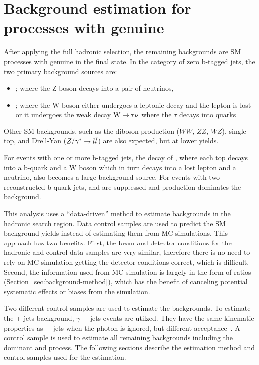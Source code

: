 \clearpage
\section{Background estimation for processes with genuine \texorpdfstring{\met}{MET}\label{sec:backgrounds}}

After applying the full hadronic selection, the remaining 
backgrounds are SM processes with genuine \met in the final state. 
In the category of zero b-tagged jets, the two primary background sources are:
\begin{itemize}
\item \zj; where the Z boson decays into a pair of neutrinos, 
\item \wj; where the W boson either undergoes a leptonic decay 
and the lepton is lost or it undergoes the weak decay ${\text W} \rightarrow \tau\nu$ where the $\tau$ decays into quarks
\end{itemize}
%
Other SM backgrounds, such as the diboson production ($WW,\,ZZ,\,WZ$), single-top, and 
Drell-Yan ($Z/\gamma^{*} \rightarrow l\bar{l}$) are also expected, but at lower yields.

For events with one or more b-tagged jets, the decay of \ttbar, where each
top decays into a b-quark and a W boson which in turn decays into 
a lost lepton and a neutrino, also becomes a large background source.
For events with two reconstructed b-quark jets, \wj and \zj are suppressed
and \ttbar production dominates the background. 

This analysis uses a ``data-driven'' method to estimate backgrounds
in the hadronic search region. Data control samples are used to predict
the SM background yields instead of estimating them from MC simulations. 
This approach has two benefits. First, the beam and detector conditions 
for the hadronic and control data samples are very similar, therefore there 
is no need to rely on MC simulation getting the detector conditions correct,
which is difficult. Second, the information used from MC simulation is largely in the form of 
ratios (Section~\ref{sec:background-method}), which has the benefit of canceling 
potential systematic effects or biases from the simulation.

Two different control samples are used to estimate the backgrounds. To estimate the
\znunu + jets background, $\gamma$ + jets events are utilzed. They have the same
kinematic properties as \znunu + jets when the photon is ignored, but 
different acceptance~\cite{PAS-SUS-08-002,Bern:2011pa}. A \mj control
sample is used to estimate all remaining backgrounds including the 
dominant \wj and \ttbar process.
The following sections describe the estimation method and control samples used 
for the estimation.

